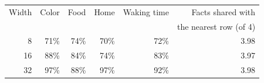 \begin{tabular}{@{}rrrrrr@{}}
\toprule
Width & Color & Food & Home & Waking time & Facts shared with \\
 & & & & & the nearest row (of 4) \\
\midrule
8 & 71\% & 74\% & 70\% & 72\% & 3.98 \\
16 & 88\% & 84\% & 74\% & 83\% & 3.97 \\
32 & 97\% & 88\% & 97\% & 92\% & 3.98 \\
\bottomrule
\end{tabular}
